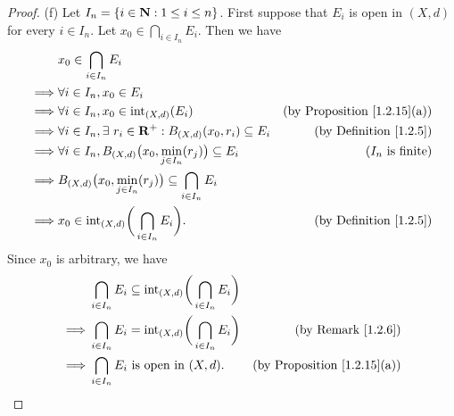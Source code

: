 \begin{proof}{(f)}
    Let \(I_n = \{i \in \mathbf{N} : 1 \leq i \leq n\}\).
    First suppose that \(E_i\) is open in \((X, d)\) for every \(i \in I_n\).
    Let \(x_0 \in \bigcap_{i \in I_n} E_i\).
    Then we have
    \begin{align*}
                 & x_0 \in \bigcap_{i \in I_n} E_i                                                                                            \\
        \implies & \forall i \in I_n, x_0 \in E_i                                                                                             \\
        \implies & \forall i \in I_n, x_0 \in \text{int}_{(X, d)}(E_i)                              & \text{(by Proposition \ref{1.2.15}(a))} \\
        \implies & \forall i \in I_n, \exists\ r_i \in \mathbf{R}^+ : B_{(X, d)}(x_0, r_i) \subseteq E_i    & \text{(by Definition \ref{1.2.5})}      \\
        \implies & \forall i \in I_n, B_{(X, d)}\big(x_0, \min_{j \in I_n}(r_j)\big) \subseteq E_i  & \text{(\(I_n\) is finite)}              \\
        \implies & B_{(X, d)}\big(x_0, \min_{j \in I_n}(r_j)\big) \subseteq \bigcap_{i \in I_n} E_i                                           \\
        \implies & x_0 \in \text{int}_{(X, d)}\bigg(\bigcap_{i \in I_n} E_i\bigg).                  & \text{(by Definition \ref{1.2.5})}
    \end{align*}
    Since \(x_0\) is arbitrary, we have
    \begin{align*}
                 & \bigcap_{i \in I_n} E_i \subseteq \text{int}_{(X, d)}\bigg(\bigcap_{i \in I_n} E_i\bigg)                                           \\
        \implies & \bigcap_{i \in I_n} E_i = \text{int}_{(X, d)}\bigg(\bigcap_{i \in I_n} E_i\bigg)         & \text{(by Remark \ref{1.2.6})}          \\
        \implies & \bigcap_{i \in I_n} E_i \text{ is open in } (X, d).                                      & \text{(by Proposition \ref{1.2.15}(a))}
    \end{align*}


\end{proof}
